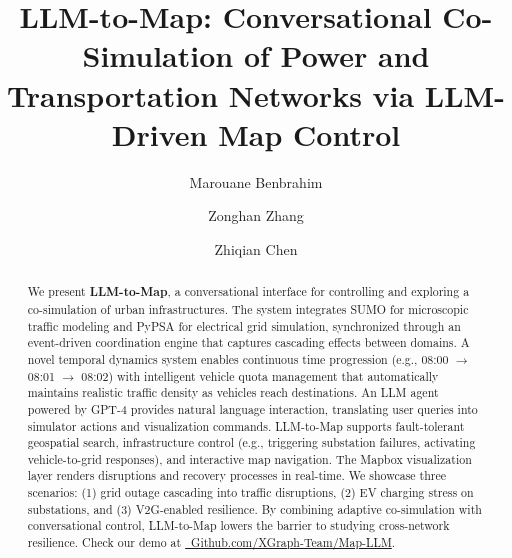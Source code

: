 \documentclass[sigconf,review,nonacm]{acmart}
\begin{document}
\title{LLM-to-Map: Conversational Co-Simulation of Power and Transportation Networks via LLM-Driven Map Control}

\author{Marouane Benbrahim}

\author{Zonghan Zhang}

\author{Zhiqian Chen}

\renewcommand{\shortauthors}{Benbrahim et al.}

\begin{abstract}
We present \textbf{LLM-to-Map}, a conversational interface for controlling and exploring a co-simulation of urban infrastructures. The system integrates SUMO for microscopic traffic modeling and PyPSA for electrical grid simulation, synchronized through an event-driven coordination engine that captures cascading effects between domains. A novel temporal dynamics system enables continuous time progression (e.g., 08:00 $\rightarrow$ 08:01 $\rightarrow$ 08:02) with intelligent vehicle quota management that automatically maintains realistic traffic density as vehicles reach destinations. An LLM agent powered by GPT-4 provides natural language interaction, translating user queries into simulator actions and visualization commands. LLM-to-Map supports fault-tolerant geospatial search, infrastructure control (e.g., triggering substation failures, activating vehicle-to-grid responses), and interactive map navigation. The Mapbox visualization layer renders disruptions and recovery processes in real-time. We showcase three scenarios: (1) grid outage cascading into traffic disruptions, (2) EV charging stress on substations, and (3) V2G-enabled resilience. By combining adaptive co-simulation with conversational control, LLM-to-Map lowers the barrier to studying cross-network resilience. Check our demo at \href{https://github.com/XGraph-Team/Map-LLM}{\faGithub\ Github.com/XGraph-Team/Map-LLM}.
\end{abstract}

\maketitle
\end{document}
